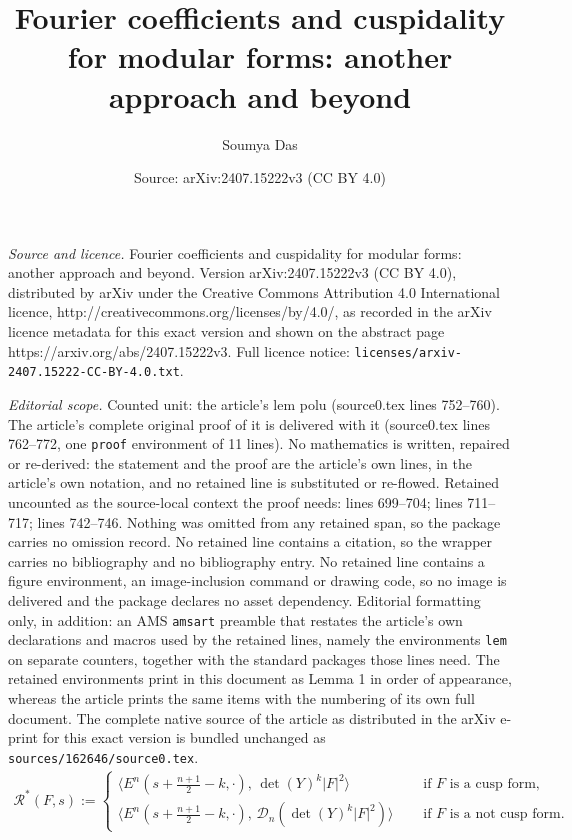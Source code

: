 \documentclass[10pt,a4paper]{amsart}
\title{Fourier coefficients and cuspidality for modular forms: another approach and beyond}
\author{Soumya Das}
\date{Source: arXiv:2407.15222v3 (CC BY 4.0)}
\newcommand{\lan}{\langle }
\newcommand{\mc}{\mathcal}
\newcommand{\q}{\quad}
\newcommand{\ran}{\rangle}
\begin{document}
\maketitle

\noindent\emph{Source and licence.} Fourier coefficients and cuspidality for modular forms: another approach and beyond. Version arXiv:2407.15222v3 (CC BY 4.0), distributed by arXiv under the Creative Commons Attribution 4.0 International licence, http://creativecommons.org/licenses/by/4.0/, as recorded in the arXiv licence metadata for this exact version and shown on the abstract page https://arxiv.org/abs/2407.15222v3. Full licence notice: \texttt{licenses/arxiv-2407.15222-CC-BY-4.0.txt}.\par\smallskip

\noindent\textit{Editorial scope.} Counted unit: the article's lem polu (source0.tex lines 752--760). The article's complete original proof of it is delivered with it (source0.tex lines 762--772, one \texttt{proof} environment of 11 lines). No mathematics is written, repaired or re-derived: the statement and the proof are the article's own lines, in the article's own notation, and no retained line is substituted or re-flowed.  Retained uncounted as the source-local context the proof needs: lines 699--704; lines 711--717; lines 742--746.  Nothing was omitted from any retained span, so the package carries no omission record.  No retained line contains a citation, so the wrapper carries no bibliography and no bibliography entry.  No retained line contains a figure environment, an image-inclusion command or drawing code, so no image is delivered and the package declares no asset dependency.  Editorial formatting only, in addition: an AMS \texttt{amsart} preamble that restates the article's own declarations and macros used by the retained lines, namely the environments \texttt{lem} on separate counters, together with the standard packages those lines need.  The retained environments print in this document as Lemma 1 in order of appearance, whereas the article prints the same items with the numbering of its own full document.  The complete native source of the article as distributed in the arXiv e-print for this exact version is bundled unchanged as \texttt{sources/162646/source0.tex}.
\begin{align} \label{rf-diffop}
\mc R^*(F,s) := \begin{cases}
\lan E^n(s +\frac{n+1}{2}-k, \cdot), \, \det(Y)^{k}|F|^2 \ran \q &\text{ if } F \text{ is a cusp form}, \\
\lan E^n(s +\frac{n+1}{2}-k, \cdot), \, \mc D_n(\det(Y)^{k}|F|^2)  \ran \q &\text{ if } F \text{ is a not cusp form}. 
\end{cases}
\end{align}
\end{document}
